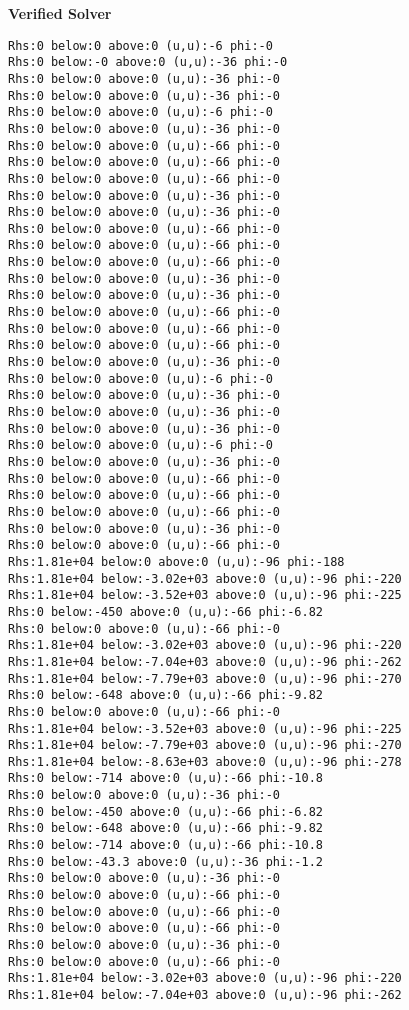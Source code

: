 \textbf{Verified Solver}

\begin{verbatim}
Rhs:0 below:0 above:0 (u,u):-6 phi:-0
Rhs:0 below:-0 above:0 (u,u):-36 phi:-0
Rhs:0 below:0 above:0 (u,u):-36 phi:-0
Rhs:0 below:0 above:0 (u,u):-36 phi:-0
Rhs:0 below:0 above:0 (u,u):-6 phi:-0
Rhs:0 below:0 above:0 (u,u):-36 phi:-0
Rhs:0 below:0 above:0 (u,u):-66 phi:-0
Rhs:0 below:0 above:0 (u,u):-66 phi:-0
Rhs:0 below:0 above:0 (u,u):-66 phi:-0
Rhs:0 below:0 above:0 (u,u):-36 phi:-0
Rhs:0 below:0 above:0 (u,u):-36 phi:-0
Rhs:0 below:0 above:0 (u,u):-66 phi:-0
Rhs:0 below:0 above:0 (u,u):-66 phi:-0
Rhs:0 below:0 above:0 (u,u):-66 phi:-0
Rhs:0 below:0 above:0 (u,u):-36 phi:-0
Rhs:0 below:0 above:0 (u,u):-36 phi:-0
Rhs:0 below:0 above:0 (u,u):-66 phi:-0
Rhs:0 below:0 above:0 (u,u):-66 phi:-0
Rhs:0 below:0 above:0 (u,u):-66 phi:-0
Rhs:0 below:0 above:0 (u,u):-36 phi:-0
Rhs:0 below:0 above:0 (u,u):-6 phi:-0
Rhs:0 below:0 above:0 (u,u):-36 phi:-0
Rhs:0 below:0 above:0 (u,u):-36 phi:-0
Rhs:0 below:0 above:0 (u,u):-36 phi:-0
Rhs:0 below:0 above:0 (u,u):-6 phi:-0
Rhs:0 below:0 above:0 (u,u):-36 phi:-0
Rhs:0 below:0 above:0 (u,u):-66 phi:-0
Rhs:0 below:0 above:0 (u,u):-66 phi:-0
Rhs:0 below:0 above:0 (u,u):-66 phi:-0
Rhs:0 below:0 above:0 (u,u):-36 phi:-0
Rhs:0 below:0 above:0 (u,u):-66 phi:-0
Rhs:1.81e+04 below:0 above:0 (u,u):-96 phi:-188
Rhs:1.81e+04 below:-3.02e+03 above:0 (u,u):-96 phi:-220
Rhs:1.81e+04 below:-3.52e+03 above:0 (u,u):-96 phi:-225
Rhs:0 below:-450 above:0 (u,u):-66 phi:-6.82
Rhs:0 below:0 above:0 (u,u):-66 phi:-0
Rhs:1.81e+04 below:-3.02e+03 above:0 (u,u):-96 phi:-220
Rhs:1.81e+04 below:-7.04e+03 above:0 (u,u):-96 phi:-262
Rhs:1.81e+04 below:-7.79e+03 above:0 (u,u):-96 phi:-270
Rhs:0 below:-648 above:0 (u,u):-66 phi:-9.82
Rhs:0 below:0 above:0 (u,u):-66 phi:-0
Rhs:1.81e+04 below:-3.52e+03 above:0 (u,u):-96 phi:-225
Rhs:1.81e+04 below:-7.79e+03 above:0 (u,u):-96 phi:-270
Rhs:1.81e+04 below:-8.63e+03 above:0 (u,u):-96 phi:-278
Rhs:0 below:-714 above:0 (u,u):-66 phi:-10.8
Rhs:0 below:0 above:0 (u,u):-36 phi:-0
Rhs:0 below:-450 above:0 (u,u):-66 phi:-6.82
Rhs:0 below:-648 above:0 (u,u):-66 phi:-9.82
Rhs:0 below:-714 above:0 (u,u):-66 phi:-10.8
Rhs:0 below:-43.3 above:0 (u,u):-36 phi:-1.2
Rhs:0 below:0 above:0 (u,u):-36 phi:-0
Rhs:0 below:0 above:0 (u,u):-66 phi:-0
Rhs:0 below:0 above:0 (u,u):-66 phi:-0
Rhs:0 below:0 above:0 (u,u):-66 phi:-0
Rhs:0 below:0 above:0 (u,u):-36 phi:-0
Rhs:0 below:0 above:0 (u,u):-66 phi:-0
Rhs:1.81e+04 below:-3.02e+03 above:0 (u,u):-96 phi:-220
Rhs:1.81e+04 below:-7.04e+03 above:0 (u,u):-96 phi:-262

\end{verbatim}
